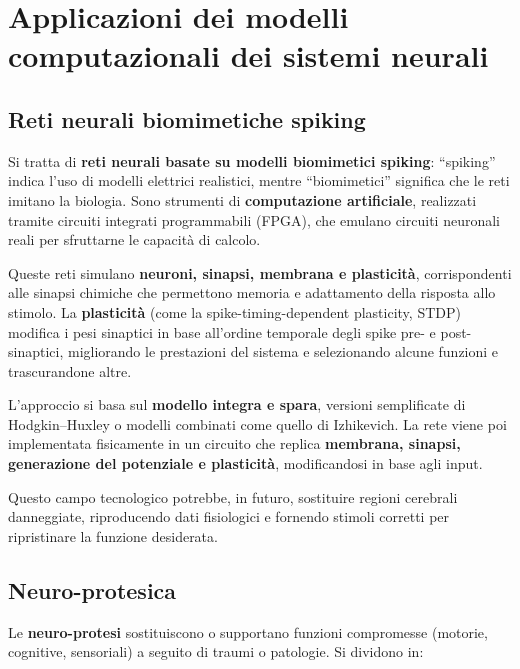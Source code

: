 \section{Applicazioni dei modelli computazionali dei sistemi neurali}

\subsection{Reti neurali biomimetiche spiking}
Si tratta di \textbf{reti neurali basate su modelli biomimetici spiking}: ``spiking'' indica l’uso di modelli elettrici realistici, mentre ``biomimetici'' significa che le reti imitano la biologia. Sono strumenti di \textbf{computazione artificiale}, realizzati tramite circuiti integrati programmabili (FPGA), che emulano circuiti neuronali reali per sfruttarne le capacità di calcolo.

Queste reti simulano \textbf{neuroni, sinapsi, membrana e plasticità}, corrispondenti alle sinapsi chimiche che permettono memoria e adattamento della risposta allo stimolo. La \textbf{plasticità} (come la spike-timing-dependent plasticity, STDP) modifica i pesi sinaptici in base all’ordine temporale degli spike pre- e post-sinaptici, migliorando le prestazioni del sistema e selezionando alcune funzioni e trascurandone altre.

L’approccio si basa sul \textbf{modello integra e spara}, versioni semplificate di Hodgkin–Huxley o modelli combinati come quello di Izhikevich. La rete viene poi implementata fisicamente in un circuito che replica \textbf{membrana, sinapsi, generazione del potenziale e plasticità}, modificandosi in base agli input.

Questo campo tecnologico potrebbe, in futuro, sostituire regioni cerebrali danneggiate, riproducendo dati fisiologici e fornendo stimoli corretti per ripristinare la funzione desiderata.

\subsection{Neuro-protesica}
Le \textbf{neuro-protesi} sostituiscono o supportano funzioni compromesse (motorie, cognitive, sensoriali) a seguito di traumi o patologie. Si dividono in:

